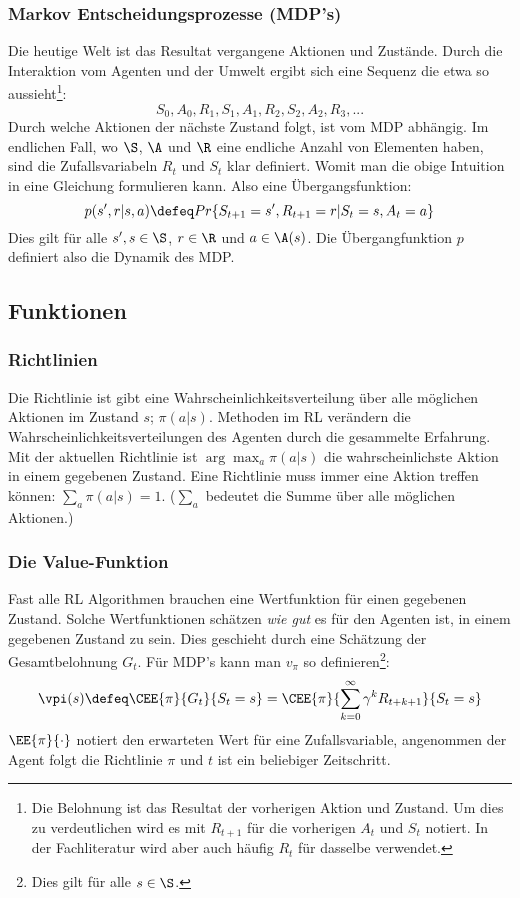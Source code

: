 \documentclass[a4paper,titlepage]{article}
\numberwithin{equation}{section} %
\begin{document}
\subsubsection{Markov Entscheidungsprozesse (MDP's)}
Die heutige Welt ist das Resultat vergangene Aktionen und Zustände. Durch die Interaktion vom Agenten und der Umwelt ergibt sich eine Sequenz die etwa so aussieht\footnote{Die Belohnung ist das Resultat der vorherigen Aktion und Zustand. Um dies zu verdeutlichen wird es mit $R_{t+1}$ für die vorherigen $A_t$ und $S_t$ notiert. In der Fachliteratur wird aber auch häufig $R_t$ für dasselbe verwendet.}:
\begin{equation} \label{eqn:sequenz}
S_{0}, A_{0}, R_{1}, S_{1}, A_{1}, R_{2}, S_{2}, A_{2}, R_{3}, ... \nonumber
\end{equation}
Durch welche Aktionen der nächste Zustand folgt, ist vom MDP abhängig. Im endlichen Fall, wo $\S$, $\A$ und $\R$ eine endliche Anzahl von Elementen haben, sind die Zufallsvariabeln $R_t$ und $S_t$ klar definiert. Womit man die obige Intuition in eine Gleichung formulieren kann. Also eine Übergangsfunktion:
\begin{equation} \label{eqn:mdp-übergang}
	p(s',r|s,a) \defeq Pr\{S_{t+1}=s', R_{t+1}=r|S_t=s,A_t=a\}
\end{equation}
Dies gilt für alle $s', s \in \S$, $r \in \R$ und $a \in \A(s)$. Die Übergangfunktion $p$ definiert also die Dynamik des MDP.

\subsection{Funktionen}
\subsubsection{Richtlinien}
Die Richtlinie ist gibt eine Wahrscheinlichkeitsverteilung über alle möglichen Aktionen im Zustand $s$; $\pi(a|s)$. Methoden im RL verändern die Wahrscheinlichkeitsverteilungen des Agenten durch die gesammelte Erfahrung.
Mit der aktuellen Richtlinie ist $\arg\max_{a}\pi(a|s)$ die wahrscheinlichste Aktion in einem gegebenen Zustand. Eine Richtlinie muss immer eine Aktion treffen können: $\sum_{a}\pi(a|s) = 1$. ($\sum_{a}$ bedeutet die Summe über alle möglichen Aktionen.)
\subsubsection{Die Value-Funktion}
Fast alle RL Algorithmen brauchen eine Wertfunktion für einen gegebenen Zustand. Solche Wertfunktionen schätzen \emph{wie gut} es für den Agenten ist, in einem gegebenen Zustand zu sein. Dies geschieht durch eine Schätzung der Gesamtbelohnung $G_t$. Für MDP's kann man $v_{\pi}$ so definieren\footnote{Dies gilt für alle $s \in \S$.}:
\begin{equation} \label{eqn:value_definition}
	\vpi(s) \defeq \CEE{\pi}{G_t}{S_t=s} = \CEE{\pi}{\sum_{k=0}^{\infty}\gamma^{k}R_{t+k+1}}{S_t=s}
\end{equation}
$\EE{\pi}{\cdot}$ notiert den erwarteten Wert für eine Zufallsvariable, angenommen der Agent folgt die Richtlinie $\pi$ und $t$ ist ein beliebiger Zeitschritt.
\end{document}
